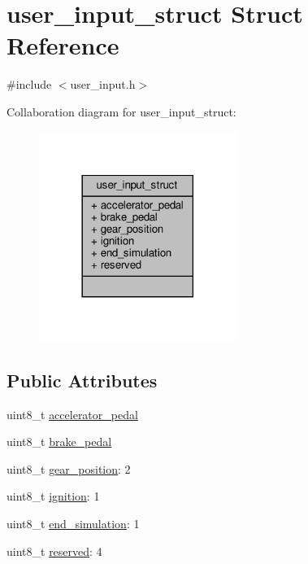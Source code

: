 \hypertarget{structuser__input__struct}{}\section{user\+\_\+input\+\_\+struct Struct Reference}
\label{structuser__input__struct}


{\ttfamily \#include $<$user\+\_\+input.\+h$>$}



Collaboration diagram for user\+\_\+input\+\_\+struct\+:
\nopagebreak
\begin{figure}[H]
\begin{center}
\leavevmode
\includegraphics[width=182pt]{structuser__input__struct__coll__graph}
\end{center}
\end{figure}
\subsection*{Public Attributes}
\begin{DoxyCompactItemize}
\item 
uint8\+\_\+t \hyperlink{structuser__input__struct_a39c7303a5781506a884a8ddc6864f2df}{accelerator\+\_\+pedal}
\item 
uint8\+\_\+t \hyperlink{structuser__input__struct_a56ed67d835e5a9bde3de53c48fd1716e}{brake\+\_\+pedal}
\item 
uint8\+\_\+t \hyperlink{structuser__input__struct_ab8a73c513d97dc1278eff647a137bab4}{gear\+\_\+position}\+: 2
\item 
uint8\+\_\+t \hyperlink{structuser__input__struct_aea05665db1f1373882f6e149a1b6d6cd}{ignition}\+: 1
\item 
uint8\+\_\+t \hyperlink{structuser__input__struct_a3a25e9361a71de81d2f61e3c081388c3}{end\+\_\+simulation}\+: 1
\item 
uint8\+\_\+t \hyperlink{structuser__input__struct_af96dd6051734c0bba913919a208d3d13}{reserved}\+: 4
\end{DoxyCompactItemize}


